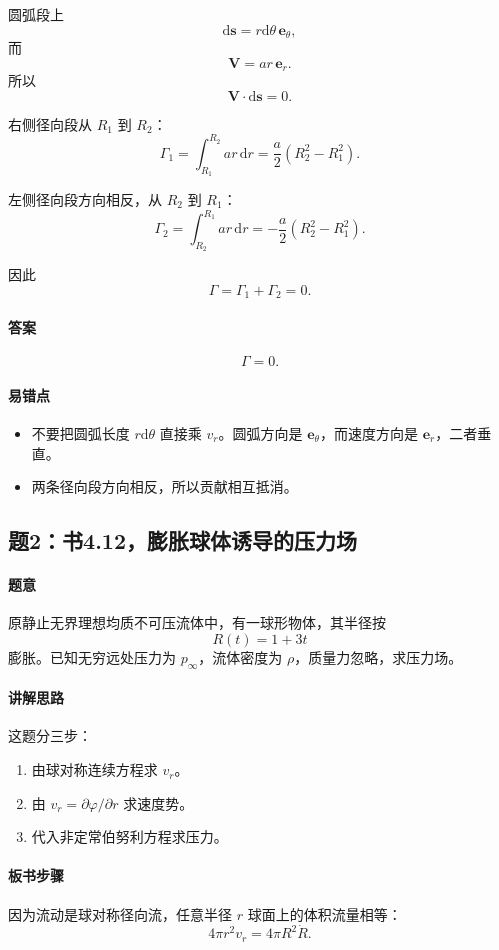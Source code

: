 ﻿\documentclass[12pt,a4paper]{ctexart}
\newcommand{\dd}{\mathrm d}
\newcommand{\pinf}{p_\infty}
\begin{document}
圆弧段上
\[
\dd \bm s=r\dd\theta\,\bm e_\theta ,
\]
而
\[
\bm V=ar\,\bm e_r.
\]
所以
\[
\bm V\cdot \dd \bm s=0.
\]

右侧径向段从 $R_1$ 到 $R_2$：
\[
\Gamma_1=\int_{R_1}^{R_2} ar\,\dd r
=\frac a2(R_2^2-R_1^2).
\]

左侧径向段方向相反，从 $R_2$ 到 $R_1$：
\[
\Gamma_2=\int_{R_2}^{R_1} ar\,\dd r
=-\frac a2(R_2^2-R_1^2).
\]

因此
\[
\Gamma=\Gamma_1+\Gamma_2=0.
\]

\paragraph{答案}
\[
\boxed{\Gamma=0.}
\]

\paragraph{易错点}
\begin{itemize}
  \item 不要把圆弧长度 $r\dd\theta$ 直接乘 $v_r$。圆弧方向是 $\bm e_\theta$，而速度方向是 $\bm e_r$，二者垂直。
  \item 两条径向段方向相反，所以贡献相互抵消。
\end{itemize}

\subsection*{题2：书4.12，膨胀球体诱导的压力场}

\paragraph{题意}
原静止无界理想均质不可压流体中，有一球形物体，其半径按
\[
R(t)=1+3t
\]
膨胀。已知无穷远处压力为 $\pinf$，流体密度为 $\rho$，质量力忽略，求压力场。

\paragraph{讲解思路}
这题分三步：
\begin{enumerate}
  \item 由球对称连续方程求 $v_r$。
  \item 由 $v_r=\partial\varphi/\partial r$ 求速度势。
  \item 代入非定常伯努利方程求压力。
\end{enumerate}

\paragraph{板书步骤}
因为流动是球对称径向流，任意半径 $r$ 球面上的体积流量相等：
\[
4\pi r^2 v_r=4\pi R^2\dot R.
\]
\end{document}
